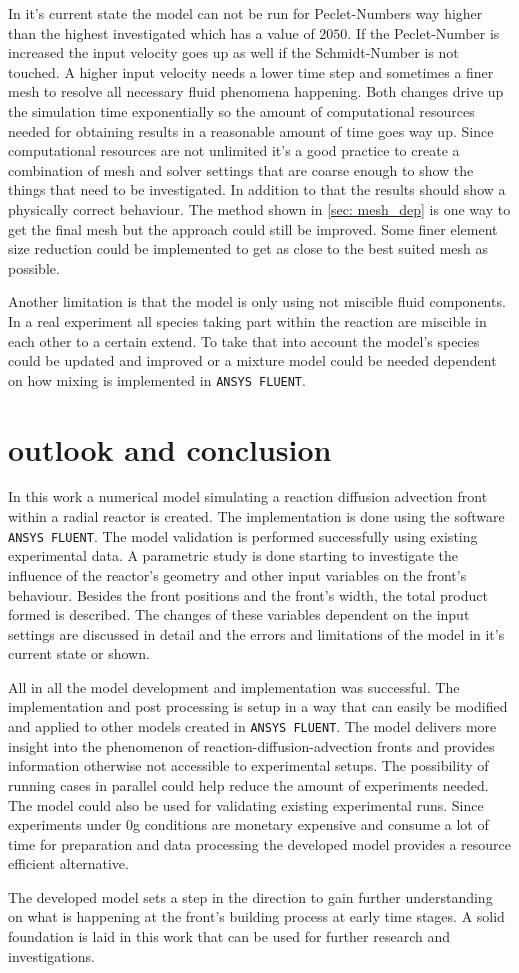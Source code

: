\documentclass[../thesis.tex]{subfiles}
\begin{document}
In it's current state the model can not be run for Peclet-Numbers way higher than the highest investigated which has a value of $2050$. If the Peclet-Number is increased the input velocity goes up as well if the Schmidt-Number is not touched. A higher input velocity needs a lower time step and sometimes a finer mesh to resolve all necessary fluid phenomena happening. Both changes drive up the simulation time exponentially so the amount of computational resources needed for obtaining results in a reasonable amount of time goes way up. Since computational resources are not unlimited it's a good practice to create a combination of mesh and solver settings that are coarse enough to show the things that need to be investigated. In addition to that the results should show a physically correct behaviour. The method shown in \autoref{sec: mesh_dep} is one way to get the final mesh but the approach could still be improved. Some finer element size reduction could be implemented to get as close to the best suited mesh as possible. 

Another limitation is that the model is only using not miscible fluid components. In a real experiment all species taking part within the reaction are miscible in each other to a certain extend. To take that into account the model's species could be updated and improved or a mixture model could be needed dependent on how mixing is implemented in \texttt{ANSYS FLUENT}. 

\chapter{outlook and conclusion}
\label{chp:out_con}

In this work a numerical model simulating a reaction diffusion advection front within a radial reactor is created. The implementation is done using the software \texttt{ANSYS FLUENT}. The model validation is performed successfully using existing experimental data. A parametric study is done starting to investigate the influence of the reactor's geometry and other input variables on the front's behaviour. Besides the front positions and the front's width, the total product formed is described. The changes of these variables dependent on the input settings are discussed in detail and the errors and limitations of the model in it's current state or shown.

All in all the model development and implementation was successful. The implementation and post processing is setup in a way that can easily be modified and applied to other models created in \texttt{ANSYS FLUENT}. The model delivers more insight into the phenomenon of reaction-diffusion-advection fronts and provides information otherwise not accessible to experimental setups. The possibility of running cases in parallel could help reduce the amount of experiments needed. The model could also be used for validating existing experimental runs. Since experiments under 0g conditions are monetary expensive and consume a lot of time for preparation and data processing the developed model provides a resource efficient alternative.

The developed model sets a step in the direction to gain further understanding on what is happening at the front's building process at early time stages. A solid foundation is laid in this work that can be used for further research and investigations.     
\end{document}
